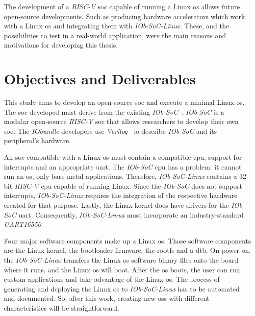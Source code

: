 The development of a \textit{RISC-V} \acrshort{soc} capable of running a Linux \acrshort{os} allows future open-source developments. Such as producing hardware accelerators which work with a Linux \acrshort{os} and integrating them with \textit{IOb-SoC-Linux}. These, and the possibilities to test in a real-world application, were the main reasons and motivations for developing this thesis.

\section{Objectives and Deliverables}
\label{section:objectives}
This study aims to develop an open-source \acrshort{soc} and execute a minimal Linux \acrshort{os}. The \acrshort{soc} developed must derive from the existing \textit{IOb-SoC}~\cite{iob_soc}. \textit{IOb-SoC} is a modular open-source \textit{RISC-V} \acrshort{soc} that allows researchers to develop their own \acrshort{soc}. The \textit{IObundle} developers use \textit{Verilog}~\cite{thomas2008verilog} to describe \textit{IOb-SoC} and its peripheral's hardware.

An \acrshort{soc} compatible with a Linux \acrshort{os} must contain a compatible \acrshort{cpu}, support for interrupts and an appropriate \acrshort{uart}. The \textit{IOb-SoC} \acrshort{cpu} has a problem: it cannot run an \acrshort{os}, only bare-metal applications. Therefore, \textit{IOb-SoC-Linux} contains a 32-bit \textit{RISC-V} \acrshort{cpu} capable of running Linux. Since the \textit{IOb-SoC} does not support interrupts, \textit{IOb-SoC-Linux} requires the integration of the respective hardware created for that purpose. Lastly, the Linux kernel does have drivers for the \textit{IOb-SoC} \acrshort{uart}. Consequently, \textit{IOb-SoC-Linux} must incorporate an industry-standard \textit{UART16550}.

Four major software components make up a Linux \acrshort{os}. Those software components are the Linux kernel, the bootloader firmware, the \acrfull{rootfs} and a \acrfull{dtb}. On power-on, the \textit{IOb-SoC-Linux} transfers the Linux \acrshort{os} software binary files onto the board where it runs, and the Linux \acrshort{os} will boot. After the \acrshort{os} boots, the user can run custom applications and take advantage of the Linux \acrshort{os}. The process of generating and deploying the Linux \acrshort{os} to \textit{IOb-SoC-Linux} has to be automated and documented. So, after this work, creating new \acrshort{os}s with different characteristics will be straightforward.

